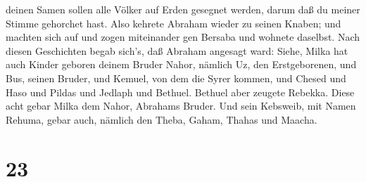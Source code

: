 deinen Samen sollen alle Völker auf Erden gesegnet werden, darum daß du
meiner Stimme gehorchet hast.  Also kehrete Abraham wieder
zu seinen Knaben; und machten sich auf und zogen miteinander gen Bersaba
und wohnete daselbst.  Nach diesen Geschichten begab
sich's, daß Abraham angesagt ward: Siehe, Milka hat auch Kinder geboren
deinem Bruder Nahor,  nämlich Uz, den Erstgeborenen, und
Bus, seinen Bruder, und Kemuel, von dem die Syrer kommen, 
und Chesed und Haso und Pildas und Jedlaph und Bethuel. 
Bethuel aber zeugete Rebekka. Diese acht gebar Milka dem Nahor, Abrahams
Bruder.  Und sein Kebsweib, mit Namen Rehuma, gebar auch,
nämlich den Theba, Gaham, Thahas und Maacha.

\hypertarget{section-22}{%
\section{23}\label{section-22}}

